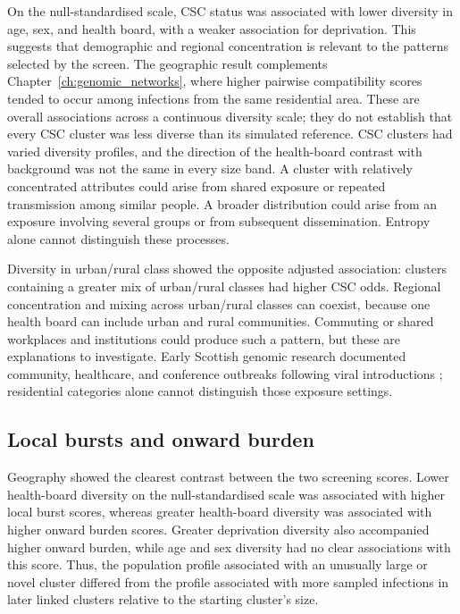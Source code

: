 On the null-standardised scale, CSC status was associated with lower diversity in age, sex, and health board, with a weaker association for deprivation. This suggests that demographic and regional concentration is relevant to the patterns selected by the screen. The geographic result complements Chapter~\ref{ch:genomic_networks}, where higher pairwise compatibility scores tended to occur among infections from the same residential area. These are overall associations across a continuous diversity scale; they do not establish that every CSC cluster was less diverse than its simulated reference. CSC clusters had varied diversity profiles, and the direction of the health-board contrast with background was not the same in every size band. A cluster with relatively concentrated attributes could arise from shared exposure or repeated transmission among similar people. A broader distribution could arise from an exposure involving several groups or from subsequent dissemination. Entropy alone cannot distinguish these processes.

Diversity in urban/rural class showed the opposite adjusted association: clusters containing a greater mix of urban/rural classes had higher CSC odds. Regional concentration and mixing across urban/rural classes can coexist, because one health board can include urban and rural communities. Commuting or shared workplaces and institutions could produce such a pattern, but these are explanations to investigate. Early Scottish genomic research documented community, healthcare, and conference outbreaks following viral introductions \citep{daSilvaFilipe2020}; residential categories alone cannot distinguish those exposure settings.

\subsection{Local bursts and onward burden}\label{sec:ch6_discussion_burst_burden_context}

Geography showed the clearest contrast between the two screening scores. Lower health-board diversity on the null-standardised scale was associated with higher local burst scores, whereas greater health-board diversity was associated with higher onward burden scores. Greater deprivation diversity also accompanied higher onward burden, while age and sex diversity had no clear associations with this score. Thus, the population profile associated with an unusually large or novel cluster differed from the profile associated with more sampled infections in later linked clusters relative to the starting cluster's size.

